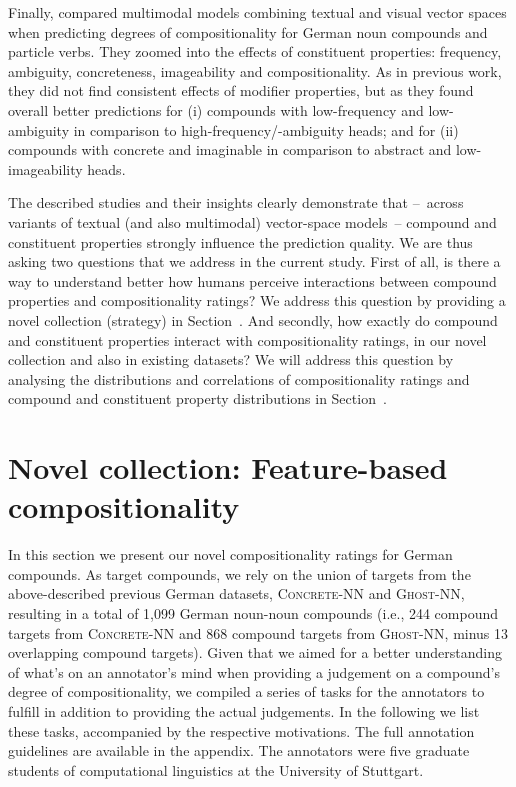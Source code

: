 \documentclass[output=paper,colorlinks,citecolor=brown]{langscibook}
\begin{document}
Finally, \citet{Koeper/SchulteImWalde:17b} compared multimodal models combining textual and visual vector spaces when predicting degrees of compositionality for German noun compounds and particle verbs. They zoomed into the effects of constituent properties: frequency, ambiguity, concreteness, imageability and compositionality. As in previous work, they did not find consistent effects of modifier properties, but as \citet{SchulteImWaldeEtAl:16b} they found overall better predictions for (i) compounds with low-frequency and low-ambiguity in comparison to high-frequency/-ambiguity heads; and for (ii) compounds with concrete and imaginable in comparison to abstract and low-imageability heads.

The described studies and their insights clearly demonstrate that --~across variants of textual (and also multimodal) vector-space models~-- compound and constituent properties strongly influence the prediction quality. We are thus asking two questions that we address in the current study. First of all, is there a way to understand better how humans perceive interactions between compound properties and compositionality ratings? We address this question by providing a novel collection (strategy) in Section~. And secondly, how exactly do compound and constituent properties interact with compositionality ratings, in our novel collection and also in existing datasets? We will address this question by analysing the distributions and correlations of compositionality ratings and compound and constituent property distributions in Section~.


\section{Novel collection: Feature-based compositionality}\label{sec:feature-nn}
\largerpage

In this section we present our novel compositionality ratings for German compounds. As target compounds, we rely on the union of targets from the above-described previous German datasets, \textsc{Concrete-NN} and \textsc{Ghost-NN}, resulting in a total of 1,099 German noun-noun compounds (i.e., 244 compound targets from \textsc{Concrete-NN} and 868 compound targets from \textsc{Ghost-NN}, minus 13 overlapping compound targets). Given that we aimed for a better understanding of what's on an annotator's mind when providing a judgement on a compound's degree of compositionality, we compiled a series of tasks for the annotators to fulfill in addition to providing the actual judgements. In the following we list these tasks, accompanied by the respective motivations. The full annotation guidelines are available in the appendix. The annotators were five graduate students of computational linguistics at the University of Stuttgart.
\end{document}
